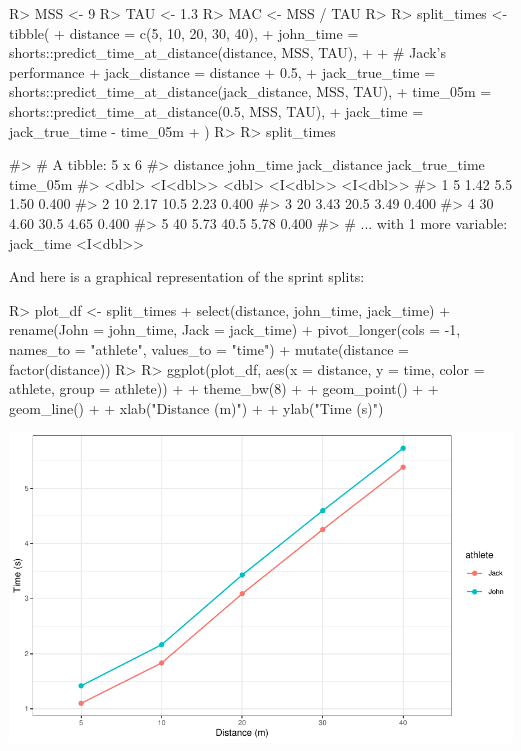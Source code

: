 \documentclass[
]{jss}
\begin{document}
\begin{CodeChunk}
\begin{CodeInput}
R> MSS <- 9
R> TAU <- 1.3
R> MAC <- MSS / TAU
R> 
R> split_times <- tibble(
+   distance = c(5, 10, 20, 30, 40),
+   john_time = shorts::predict_time_at_distance(distance, MSS, TAU),
+ 
+   # Jack's performance
+   jack_distance = distance + 0.5,
+   jack_true_time = shorts::predict_time_at_distance(jack_distance, MSS, TAU),
+   time_05m = shorts::predict_time_at_distance(0.5, MSS, TAU),
+   jack_time = jack_true_time - time_05m
+ )
R> 
R> split_times
\end{CodeInput}
\begin{CodeOutput}
#> # A tibble: 5 x 6
#>   distance john_time jack_distance jack_true_time time_05m
#>      <dbl>  <I<dbl>>         <dbl>       <I<dbl>> <I<dbl>>
#> 1        5      1.42           5.5           1.50    0.400
#> 2       10      2.17          10.5           2.23    0.400
#> 3       20      3.43          20.5           3.49    0.400
#> 4       30      4.60          30.5           4.65    0.400
#> 5       40      5.73          40.5           5.78    0.400
#> # ... with 1 more variable: jack_time <I<dbl>>
\end{CodeOutput}
\end{CodeChunk}

And here is a graphical representation of the sprint splits:

\begin{CodeChunk}
\begin{CodeInput}
R> plot_df <- split_times %
+   select(distance, john_time, jack_time) %
+   rename(John = john_time, Jack = jack_time) %
+   pivot_longer(cols = -1, names_to = "athlete", values_to = "time") %
+   mutate(distance = factor(distance))
R> 
R> ggplot(plot_df, aes(x = distance, y = time, color = athlete, group = athlete)) +
+   theme_bw(8) +
+   geom_point() +
+   geom_line() +
+   xlab("Distance (m)") +
+   ylab("Time (s)")
\end{CodeInput}


\begin{center}\includegraphics[width=1\linewidth]{paper_files/figure-latex/unnamed-chunk-23-1} \end{center}

\end{CodeChunk}
\end{document}
